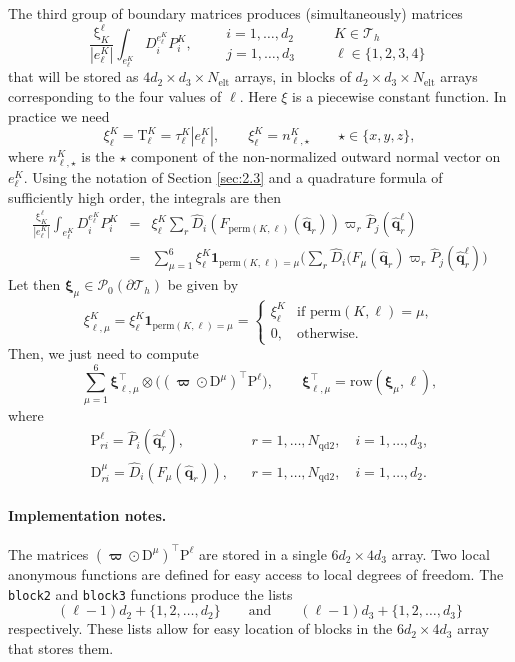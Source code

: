 \documentclass[10pt,english]{article}
\newcommand{\Nelt}{{N_{\mathrm{elt}}}}
\newcommand{\Nndb}{{N_{\mathrm{qd2}}}}
\newcommand{\qq}{\widehat{\mathbf q}}
\begin{document}
The third group of boundary matrices produces (simultaneously) matrices
\[
\frac{\mathrm \xi_K^\ell}{|e_\ell^K|} \int_{e_\ell^K} D_i^{e_\ell^K} P_i^K, \qquad \begin{array}{c}i=1,\ldots,d_2\\
j=1,\ldots,d_3\end{array}\qquad \begin{array}{c}K \in \mathcal T_h\\ \ell\in\{1,2,3,4\}
\end{array}
\]
that will be stored as $4d_2\times d_3\times \Nelt$ arrays, in blocks of $d_2\times d_3\times \Nelt$ arrays corresponding to the four values of $\ell$. Here $\xi$ is a piecewise constant function. In practice we need
\[
\xi^K_\ell=\mathrm T^K_\ell=\tau^K_\ell |e_\ell^K|, \qquad \xi^K_\ell = n^K_{\ell,\star} \qquad \star\in \{x,y,z\},
\]
where $n^K_{\ell,\star}$ is the $\star$ component of the non-normalized outward normal vector on $e_\ell^K$.
Using the notation of Section \ref{sec:2.3} and a quadrature formula of sufficiently high order, the integrals are then
\begin{eqnarray*}
\frac{\mathrm \xi_K^\ell}{|e_\ell^K|} \int_{e_\ell^K} D_i^{e_\ell^K} P_i^K&=&  \xi_\ell^K \sum_r \widehat D_i(F_{\mathrm{perm}(K,\ell)} (\qq_r) )\varpi_r \widehat P_j(\qq_r^\ell)\\
&=& \sum_{\mu=1}^6 \xi_\ell^K \mathbf 1_{\mathrm{perm}(K,\ell)=\mu} \Big( \sum_r \widehat D_i(F_\mu(\qq_r)\varpi_r\widehat P_j(\qq_r^\ell)\Big)
\end{eqnarray*}
Let then $\boldsymbol\xi_\mu\in \mathcal P_0(\partial\mathcal T_h)$ be given by
\[
\xi_{\ell,\mu}^K= \xi_\ell^K \mathbf 1_{\mathrm{perm}(K,\ell)=\mu} =\left\{ \begin{array}{ll}\xi_\ell^K & \mbox{if $\mathrm{perm}(K,\ell)=\mu$},\\0, & \mbox{otherwise}.\end{array}\right.
\]
Then, we just need to compute
\[
\sum_{\mu=1}^6 \boldsymbol\xi_{\ell,\mu}^\top \otimes \big( (\boldsymbol\varpi\odot \mathrm D^\mu)^\top\mathrm P^\ell\big), \qquad \boldsymbol\xi_{\ell,\mu}^\top=\mathrm{row}(\boldsymbol\xi_\mu,\ell),
\]
where
\begin{eqnarray*}
\mathrm P^\ell_{ri}=\widehat P_i(\qq_r^\ell), & &   r=1,\ldots,\Nndb, \quad i=1,\ldots,d_3, \\ \mathrm D^\mu_{ri}=\widehat D_i(F_\mu(\qq_r)), & &  r=1,\ldots,\Nndb, \quad i=1,\ldots,d_2.
\end{eqnarray*}

\paragraph{Implementation notes.} The matrices $ (\boldsymbol\varpi\odot \mathrm D^\mu)^\top\mathrm P^\ell$ are stored in a single $6d_2\times 4d_3$ array.
Two local anonymous functions are defined for easy access to local degrees of freedom. The {\tt block2} and {\tt block3} functions produce the lists
\[
(\ell-1) d_2+\{1,2,\ldots,d_2\} \qquad \mbox{and}\qquad (\ell-1) d_3+\{1,2,\ldots,d_3\}
\]
respectively. These lists allow for easy location of blocks in the $6d_2\times 4d_3$ array that stores them.
\end{document}
